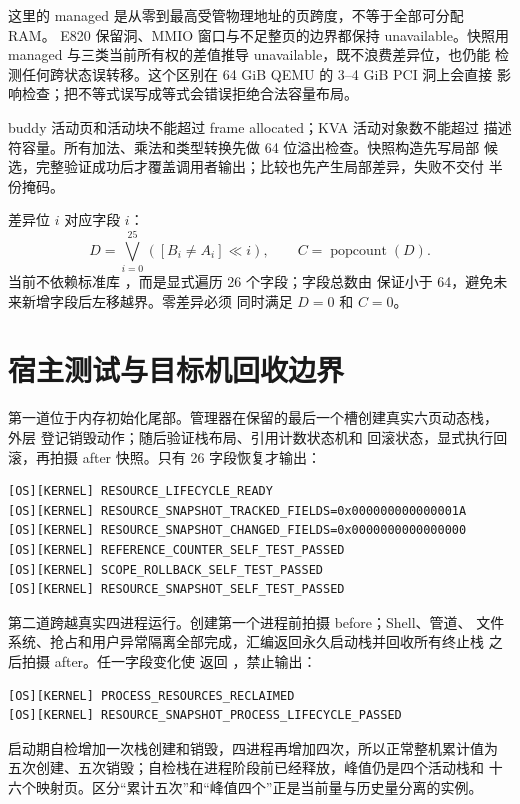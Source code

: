 这里的 managed 是从零到最高受管物理地址的页跨度，不等于全部可分配 RAM。
E820 保留洞、MMIO 窗口与不足整页的边界都保持 unavailable。快照用
managed 与三类当前所有权的差值推导 unavailable，既不浪费差异位，也仍能
检测任何跨状态误转移。这个区别在 64 GiB QEMU 的 3--4 GiB PCI 洞上会直接
影响检查；把不等式误写成等式会错误拒绝合法容量布局。

buddy 活动页和活动块不能超过 frame allocated；KVA 活动对象数不能超过
描述符容量。所有加法、乘法和类型转换先做 64 位溢出检查。快照构造先写局部
候选，完整验证成功后才覆盖调用者输出；比较也先产生局部差异，失败不交付
半份掩码。

差异位 \(i\) 对应字段 \(i\)：
\[
  D=\bigvee_{i=0}^{25}
  \left([B_i\ne A_i]\ll i\right),\qquad
  C=\operatorname{popcount}(D).
\]
当前不依赖标准库 ，而是显式遍历 26 个字段；字段总数由
 保证小于 64，避免未来新增字段后左移越界。零差异必须
同时满足 \(D=0\) 和 \(C=0\)。

\section{宿主测试与目标机回收边界}
第一道位于内存初始化尾部。管理器在保留的最后一个槽创建真实六页动态栈，
外层  登记销毁动作；随后验证栈布局、引用计数状态机和
回滚状态，显式执行回滚，再拍摄 after 快照。只有 26 字段恢复才输出：

\begin{verbatim}
[OS][KERNEL] RESOURCE_LIFECYCLE_READY
[OS][KERNEL] RESOURCE_SNAPSHOT_TRACKED_FIELDS=0x000000000000001A
[OS][KERNEL] RESOURCE_SNAPSHOT_CHANGED_FIELDS=0x0000000000000000
[OS][KERNEL] REFERENCE_COUNTER_SELF_TEST_PASSED
[OS][KERNEL] SCOPE_ROLLBACK_SELF_TEST_PASSED
[OS][KERNEL] RESOURCE_SNAPSHOT_SELF_TEST_PASSED
\end{verbatim}

第二道跨越真实四进程运行。创建第一个进程前拍摄 before；Shell、管道、
文件系统、抢占和用户异常隔离全部完成，汇编返回永久启动栈并回收所有终止栈
之后拍摄 after。任一字段变化使  返回
，禁止输出：

\begin{verbatim}
[OS][KERNEL] PROCESS_RESOURCES_RECLAIMED
[OS][KERNEL] RESOURCE_SNAPSHOT_PROCESS_LIFECYCLE_PASSED
\end{verbatim}

启动期自检增加一次栈创建和销毁，四进程再增加四次，所以正常整机累计值为
五次创建、五次销毁；自检栈在进程阶段前已经释放，峰值仍是四个活动栈和
十六个映射页。区分“累计五次”和“峰值四个”正是当前量与历史量分离的实例。

